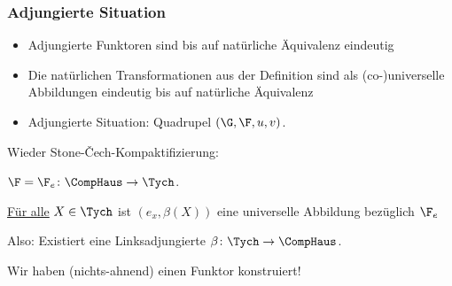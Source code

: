 \begin{frame}
  \frametitle{Adjungierte Situation}

  \begin{itemize}
    \item<+-> Adjungierte Funktoren sind bis auf natürliche Äquivalenz eindeutig
    \item<+-> Die natürlichen Transformationen aus der Definition sind als (co-)universelle Abbildungen eindeutig bis auf natürliche Äquivalenz
    \item<+-> Adjungierte Situation: Quadrupel $(\G, \F, u, v)$. 
  \end{itemize}

\pause

  \begin{ex*}
     Wieder Stone-\v{C}ech-Kompaktifizierung:

     $\F = \F_e \colon \CompHaus \to \Tych$.

\pause

     \underline{Für alle} $X \in \Tych$ ist $(e_x, \beta(X))$ eine universelle Abbildung bezüglich $\F_e$
     
     Also: Existiert eine Linksadjungierte $\beta \colon \Tych \to \CompHaus$.
     \vspace{1em}

\pause

     Wir haben (nichts-ahnend) einen Funktor konstruiert!
  \end{ex*}

\end{frame}

